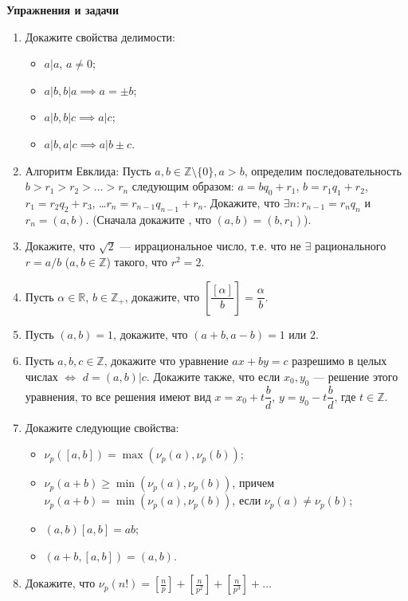 \noindent\textbf{Упражнения и задачи}

\begin{enumerate}[topsep=0pt]
    \item Докажите свойства делимости: 
    \begin{itemize}[noitemsep,topsep=0pt]
        \item $a | a$, $a \neq 0$;
        \item $a|b, b|a \implies a=\pm b$;
        \item $a|b, b|c \implies a|c$;
        \item $a|b, a|c \implies a| b\pm c$.
    \end{itemize}
    \item Алгоритм Евклида: Пусть $a,b \in\mathbb{Z} \setminus \{0\}, a>b$, определим последовательность $b>r_1>r_2>\dots > r_n$ следующим образом: $a=bq_0+r_1$, $b=r_1q_1+r_2$, $r_1=r_2q_2+r_3$, \dots $r_n=r_{n-1} q_{n-1}+r_n$. Докажите, что $\exists n: r_{n-1}=r_nq_n$ и $r_n=(a,b)$. (Сначала докажите , что $(a,b)=(b,r_1)$).
    \item Докажите, что $\sqrt{2}$ --- иррациональное число, т.е. что не $\exists$ рационального $r=a/b$ ($a,b \in \mathbb{Z}$) такого, что $r^2=2$.
    \item Пусть $\alpha \in \mathbb{R}$, $b\in\mathbb{Z}_+$, докажите, что $\left[\dfrac{[\alpha]}{b}\right]=\dfrac{\alpha}{b}$.
    \item Пусть $(a,b)=1$, докажите, что $(a+b,a-b)=1$ или $2$.
    \item Пусть $a,b,c \in \mathbb{Z}$, докажите что уравнение $ax+by=c$ разрешимо в целых числах $\iff$ $d=(a,b)|c$. Докажите также, что если $x_0,y_0$ --- решение этого уравнения, то все решения имеют вид $x=x_0+t\dfrac{b}{d}$, $y=y_0-t\dfrac{b}{d}$, где  $t \in \mathbb{Z}$.
    \item Докажите следующие свойства:
    \begin{itemize}[noitemsep,topsep=0pt]
        \item $\nu_p([a,b])=\max(\nu_p(a),\nu_p(b))$;
        \item $\nu_p(a+b)\geqslant \min(\nu_p(a),\nu_p(b))$, причем $\nu_p(a+b)= \min(\nu_p(a),\nu_p(b))$, если $\nu_p(a) \neq \nu_p(b)$;
        \item $(a,b)[a,b]=ab$;
        \item $(a+b,[a,b])=(a,b)$.
    \end{itemize}
    \item Докажите, что $\nu_p(n!)= \left[\frac{n}{p}\right] + \left[\frac{n}{p^2}\right] + \left[\frac{n}{p^3}\right] + \dots $

\end{enumerate}
